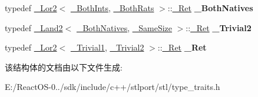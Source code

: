 \begin{DoxyCompactItemize}
\item 
\mbox{\label{struct___trivial_native_type_copy_a8f97be2ade57d2a6bf56b06ed32593e0}} 
typedef \hyperlink{struct___lor2}{\+\_\+\+Lor2}$<$ \hyperlink{struct____false__type}{\+\_\+\+Both\+Ints}, \hyperlink{struct____false__type}{\+\_\+\+Both\+Rats} $>$\+::\hyperlink{struct____true__type}{\+\_\+\+Ret} {\bfseries \+\_\+\+Both\+Natives}
\item 
\mbox{\label{struct___trivial_native_type_copy_a79b1dbd8df8c28ba0dcd4fa9ad7bddbe}} 
typedef \hyperlink{struct___land2}{\+\_\+\+Land2}$<$ \hyperlink{struct____true__type}{\+\_\+\+Both\+Natives}, \hyperlink{struct____true__type}{\+\_\+\+Same\+Size} $>$\+::\hyperlink{struct____true__type}{\+\_\+\+Ret} {\bfseries \+\_\+\+Trivial2}
\item 
\mbox{\label{struct___trivial_native_type_copy_ae66df0f8c981f654a54b2e2e6174b3d1}} 
typedef \hyperlink{struct___lor2}{\+\_\+\+Lor2}$<$ \hyperlink{struct____false__type}{\+\_\+\+Trivial1}, \hyperlink{struct____false__type}{\+\_\+\+Trivial2} $>$\+::\hyperlink{struct____true__type}{\+\_\+\+Ret} {\bfseries \+\_\+\+Ret}
\end{DoxyCompactItemize}


该结构体的文档由以下文件生成\+:\begin{DoxyCompactItemize}
\item 
E\+:/\+React\+O\+S-\/0../sdk/include/c++/stlport/stl/type\+\_\+traits.\+h\end{DoxyCompactItemize}
